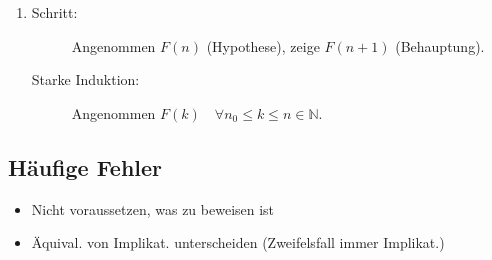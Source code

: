 \begin{description}
\begin{enumerate}
      \item \begin{description}
              \item [Schritt:]
                    Angenommen
                    $F(n)$ (Hypothese),
                    zeige $F(n + 1)$ (Behauptung).
              \item [Starke Induktion:]
                    Angenommen
                    $F(k) \quad \forall n_0 \leq k \leq n \in \mathbb{N}$.
            \end{description}
    \end{enumerate}
\end{description}

\subsection{Häufige Fehler}

\begin{itemize}
  \item Nicht voraussetzen, was zu beweisen ist

  \item Äquival. von Implikat. unterscheiden (Zweifelsfall immer Implikat.)
\end{itemize}